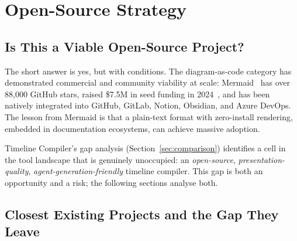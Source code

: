 
\section{Open-Source Strategy}
\label{sec:oss-strategy}

\subsection{Is This a Viable Open-Source Project?}

The short answer is yes, but with conditions.
The diagram-as-code category has demonstrated commercial and community
viability at scale: Mermaid~\cite{mermaid2023} has over 88{,}000 GitHub
stars, raised \$7.5M in seed funding in 2024~\cite{mermaidchart2024}, and
has been natively integrated into GitHub, GitLab, Notion, Obsidian, and
Azure DevOps.
The lesson from Mermaid is that a plain-text format with zero-install
rendering, embedded in documentation ecosystems, can achieve massive adoption.

Timeline Compiler's gap analysis (Section~\ref{sec:comparison}) identifies
a cell in the tool landscape that is genuinely unoccupied: an
\emph{open-source}, \emph{presentation-quality}, \emph{agent-generation-friendly}
timeline compiler.
This gap is both an opportunity and a risk; the following sections analyse
both.

\subsection{Closest Existing Projects and the Gap They Leave}
\label{sec:oss-gap}


